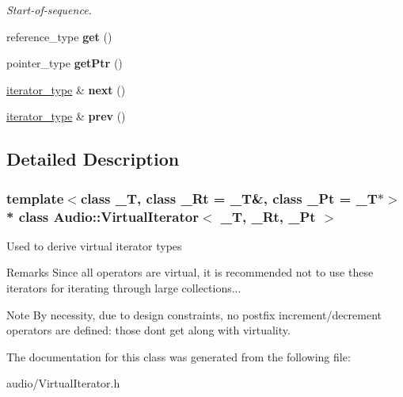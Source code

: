 \begin{DoxyCompactItemize}
\begin{DoxyCompactList}\small\item\em Start-\/of-\/sequence. \end{DoxyCompactList}\item 
reference\+\_\+type {\bfseries get} ()\hypertarget{classAudio_1_1VirtualIterator_a0eab4313cefa891448dcc5ff0aa0a84f}{}\label{classAudio_1_1VirtualIterator_a0eab4313cefa891448dcc5ff0aa0a84f}

\item 
pointer\+\_\+type {\bfseries get\+Ptr} ()\hypertarget{classAudio_1_1VirtualIterator_adab80af4061c31ec8079174fd97dd9d1}{}\label{classAudio_1_1VirtualIterator_adab80af4061c31ec8079174fd97dd9d1}

\item 
\hyperlink{classAudio_1_1VirtualIterator}{iterator\+\_\+type} \& {\bfseries next} ()\hypertarget{classAudio_1_1VirtualIterator_a842aeb1422e73b6d301a7f36105d9951}{}\label{classAudio_1_1VirtualIterator_a842aeb1422e73b6d301a7f36105d9951}

\item 
\hyperlink{classAudio_1_1VirtualIterator}{iterator\+\_\+type} \& {\bfseries prev} ()\hypertarget{classAudio_1_1VirtualIterator_ae2f9f09a6830b3e079110f2c7343a9b3}{}\label{classAudio_1_1VirtualIterator_ae2f9f09a6830b3e079110f2c7343a9b3}

\end{DoxyCompactItemize}


\subsection{Detailed Description}
\subsubsection*{template$<$class \+\_\+T, class \+\_\+\+Rt = \+\_\+\+T\&, class \+\_\+\+Pt = \+\_\+\+T$\ast$$>$\\*
class Audio\+::\+Virtual\+Iterator$<$ \+\_\+\+T, \+\_\+\+Rt, \+\_\+\+Pt $>$}

Used to derive virtual iterator types \begin{DoxyRemark}{Remarks}
Since all operators are virtual, it is recommended not to use these iterators for iterating through large collections... 
\end{DoxyRemark}
\begin{DoxyNote}{Note}
By necessity, due to design constraints, no postfix increment/decrement operators are defined\+: those don\textquotesingle{}t get along with virtuality. 
\end{DoxyNote}


The documentation for this class was generated from the following file\+:\begin{DoxyCompactItemize}
\item 
audio/Virtual\+Iterator.\+h\end{DoxyCompactItemize}
